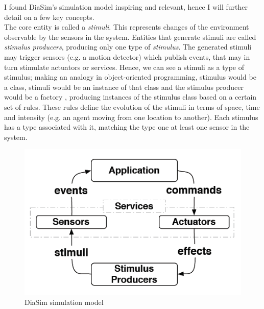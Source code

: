 I found DiaSim's simulation model inspiring and relevant, hence I will further detail on a few key concepts.\\

The core entity is called a \emph{stimuli}. This represents changes of the environment observable by the sensors in the system. Entities that generate stimuli are called \emph{stimulus producers}, producing only one type of \emph{stimulus}. The generated stimuli may trigger sensors (e.g. a motion detector) which publish events, that may in turn stimulate actuators or services. Hence, we can see a stimuli as a type of stimulus; making an analogy in object-oriented programming, stimulus would be a class, stimuli would be an instance of that class and the stimulus producer would be a factory \cite{gamma1994design}, producing instances of the stimulus class based on a certain set of rules. These rules define the evolution of the stimuli in terms of space, time and intensity (e.g. an agent moving from one location to another). Each stimulus has a type associated with it, matching the type one at least one sensor in the system.\\

\begin{figure}[H]
	\centering
	\includegraphics[width=\linewidth]{gfx/Chapter2/diasim_simulation_model}
	\caption{DiaSim simulation model}
	\label{fig:diasim_simulation_model}
\end{figure}

